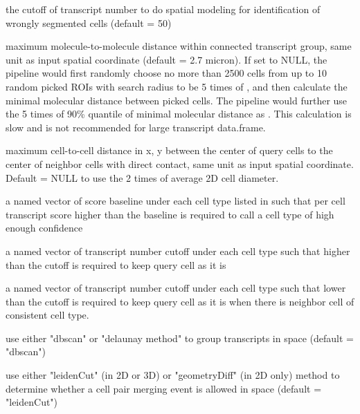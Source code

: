\documentclass[letterpaper]{book}
\begin{document}
\begin{Arguments}
\begin{ldescription}
\item[\code{flagModel\_TransNum\_cutoff}] the cutoff of transcript number to do spatial modeling for identification of wrongly segmented cells (default = 50)

\item[\code{molecular\_distance\_cutoff}] maximum molecule-to-molecule distance within connected transcript group, same unit as input spatial coordinate (default = 2.7 micron).
If set to NULL, the pipeline would first randomly choose no more than 2500 cells from up to 10 random picked ROIs with search radius to be 5 times of , and then calculate the minimal molecular distance between picked cells. The pipeline would further use the 5 times of 90\% quantile of minimal molecular distance as . This calculation is slow and is not recommended for large transcript data.frame.

\item[\code{cellular\_distance\_cutoff}] maximum cell-to-cell distance in x, y between the center of query cells to the center of neighbor cells with direct contact, same unit as input spatial coordinate. Default = NULL to use the 2 times of average 2D cell diameter.

\item[\code{score\_baseline}] a named vector of score baseline under each cell type listed in  such that per cell transcript score higher than the baseline is required to call a cell type of high enough confidence

\item[\code{lowerCutoff\_transNum}] a named vector of transcript number cutoff under each cell type such that higher than the cutoff is required to keep query cell as it is

\item[\code{higherCutoff\_transNum}] a named vector of transcript number cutoff under each cell type such that lower than the cutoff is required to keep query cell as it is when there is neighbor cell of consistent cell type.

\item[\code{groupTranscripts\_method}] use either "dbscan" or "delaunay method" to group transcripts in space (default = "dbscan")

\item[\code{spatialMergeCheck\_method}] use either "leidenCut" (in 2D or 3D) or "geometryDiff" (in 2D only) method to determine whether a cell pair merging event is allowed in space (default = "leidenCut")


\end{ldescription}
\end{Arguments}
\end{document}
